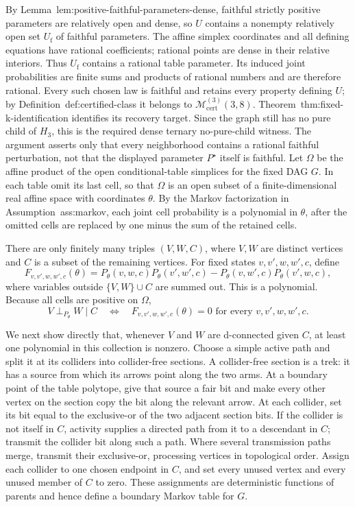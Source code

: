 By Lemma~\textnormal{lem:positive-faithful-parameters-dense}, faithful strictly positive parameters are relatively open and dense, so \(U\) contains a nonempty relatively open set \(U_{\mathrm f}\) of faithful parameters.  The affine simplex coordinates and all defining equations have rational coefficients; rational points are dense in their relative interiors.  Thus \(U_{\mathrm f}\) contains a rational table parameter.  Its induced joint probabilities are finite sums and products of rational numbers and are therefore rational.  Every such chosen law is faithful and retains every property defining \(U\); by Definition~\textnormal{def:certified-class} it belongs to \(\mathcal M_{\mathrm{cert}}^{(3)}(3,8)\).  Theorem~\textnormal{thm:fixed-k-identification} identifies its recovery target.  Since the graph still has no pure child of \(H_3\), this is the required dense ternary no-pure-child witness.  The argument asserts only that every neighborhood contains a rational faithful perturbation, not that the displayed parameter \(P^{\star}\) itself is faithful.
Let \(\Omega\) be the affine product of the open conditional-table simplices for the fixed DAG \(G\).  In each table omit its last cell, so that \(\Omega\) is an open subset of a finite-dimensional real affine space with coordinates \(\theta\).  By the Markov factorization in Assumption~\textnormal{ass:markov}, each joint cell probability is a polynomial in \(\theta\), after the omitted cells are replaced by one minus the sum of the retained cells.

There are only finitely many triples \((V,W,C)\), where \(V,W\) are distinct vertices and \(C\) is a subset of the remaining vertices.  For fixed states \(v,v',w,w',c\), define
\[
 F_{v,v',w,w',c}(\theta)
 =P_\theta(v,w,c)P_\theta(v',w',c)
  -P_\theta(v,w',c)P_\theta(v',w,c),
\]
where variables outside \(\{V,W\}\cup C\) are summed out.  This is a polynomial.  Because all cells are positive on \(\Omega\),
\[
 V\mathrel{\perp}_{P_\theta}W\mid C
 \quad\Longleftrightarrow\quad
 F_{v,v',w,w',c}(\theta)=0
 \text{ for every }v,v',w,w',c.
\]

We next show directly that, whenever \(V\) and \(W\) are d-connected given \(C\), at least one polynomial in this collection is nonzero.  Choose a simple active path and split it at its colliders into collider-free sections.  A collider-free section is a trek: it has a source from which its arrows point along the two arms.  At a boundary point of the table polytope, give that source a fair bit and make every other vertex on the section copy the bit along the relevant arrow.  At each collider, set its bit equal to the exclusive-or of the two adjacent section bits.  If the collider is not itself in \(C\), activity supplies a directed path from it to a descendant in \(C\); transmit the collider bit along such a path.  Where several transmission paths merge, transmit their exclusive-or, processing vertices in topological order.  Assign each collider to one chosen endpoint in \(C\), and set every unused vertex and every unused member of \(C\) to zero.  These assignments are deterministic functions of parents and hence define a boundary Markov table for \(G\).

